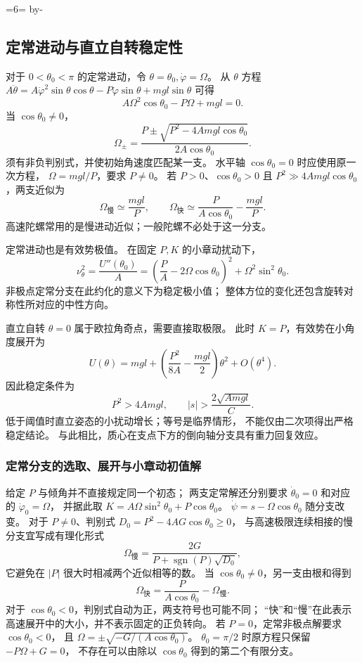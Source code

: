 \documentclass[UTF8,zihao=-4,fontset=fandol,a4paper]{ctexart}
\makeatletter
\newcommand{\Needspace}[1]{\par\if@nobreak\else\penalty0\begingroup\dimen0=#1\relax\dimen2=\pagegoal\advance\dimen2 by-\pagetotal\ifdim\dimen0>\dimen2\newpage\fi\endgroup\fi}
\let\SavedSubsection\subsection
\renewcommand{\subsection}{\Needspace{6\baselineskip}\SavedSubsection}
\makeatother
\begin{document}
\subsection{定常进动与直立自转稳定性}\label{sub:c3-9.4}
对于 $0<\theta_0<\pi$ 的定常进动，令
$\theta=\theta_0,\dot\varphi=\Omega$。
从 $\theta$ 方程
$A\ddot\theta=A\dot\varphi^2\sin\theta\cos\theta
-P\dot\varphi\sin\theta+mgl\sin\theta$
可得
\begin{equation}\label{eq:regularprecession}
A\Omega^2\cos\theta_0-P\Omega+mgl=0.
\end{equation}
当 $\cos\theta_0\ne0$，
\[
\Omega_\pm=\frac{P\pm\sqrt{P^2-4Amgl\cos\theta_0}}
{2A\cos\theta_0}.
\]
须有非负判别式，并使初始角速度匹配某一支。
水平轴 $\cos\theta_0=0$ 时应使用原一次方程，
$\Omega=mgl/P$，要求 $P\ne0$。
若 $P>0$、$\cos\theta_0>0$ 且
$P^2\gg4Amgl\cos\theta_0$，两支近似为
\[
\Omega_{\text{慢}}\simeq\frac{mgl}{P},\qquad
\Omega_{\text{快}}\simeq\frac{P}{A\cos\theta_0}-\frac{mgl}{P}.
\]
高速陀螺常用的是慢进动近似；一般陀螺不必处于这一分支。

定常进动也是有效势极值。
在固定 $P,K$ 的小章动扰动下，
\[
\nu_\theta^2=\frac{U''(\theta_0)}A
=\left(\frac PA-2\Omega\cos\theta_0\right)^2
+\Omega^2\sin^2\theta_0.
\]
非极点定常分支在此约化的意义下为稳定极小值；
整体方位的变化还包含旋转对称性所对应的中性方向。

直立自转 $\theta=0$ 属于欧拉角奇点，需要直接取极限。
此时 $K=P$，有效势在小角度展开为
\[
U(\theta)=mgl+
\left(\frac{P^2}{8A}-\frac{mgl}{2}\right)\theta^2+O(\theta^4).
\]
因此稳定条件为
\[
P^2>4Amgl,\qquad
|s|>\frac{2\sqrt{Amgl}}{C}.
\]
低于阈值时直立姿态的小扰动增长；等号是临界情形，
不能仅由二次项得出严格稳定结论。
与此相比，质心在支点下方的倒向轴分支具有重力回复效应。


\subsubsection*{定常分支的选取、展开与小章动初值解}
给定 $P$ 与倾角并不直接规定同一个初态；
两支定常解还分别要求 $\dot\theta_0=0$ 和对应的 $\dot\varphi_0=\Omega$，
并据此取 $K=A\Omega\sin^2\theta_0+P\cos\theta_0$。
$\dot\psi=s-\Omega\cos\theta_0$ 随分支改变。
对于 $P\ne0$、判别式 $D_0=P^2-4AG\cos\theta_0\ge0$，
与高速极限连续相接的慢分支宜写成有理化形式
\[
\Omega_{\text{慢}}=
\frac{2G}{P+\operatorname{sgn}(P)\sqrt{D_0}},
\]
它避免在 $|P|$ 很大时相减两个近似相等的数。
当 $\cos\theta_0\ne0$，另一支由根和得到
\[
\Omega_{\text{快}}=\frac{P}{A\cos\theta_0}-\Omega_{\text{慢}}.
\]
对于 $\cos\theta_0<0$，判别式自动为正，两支符号也可能不同；
“快”和“慢”在此表示高速展开中的大小，并不表示固定的正负转向。
若 $P=0$，定常非极点解要求 $\cos\theta_0<0$，
且 $\Omega=\pm\sqrt{-G/(A\cos\theta_0)}$。
$\theta_0=\pi/2$ 时原方程只保留 $-P\Omega+G=0$，
不存在可以由除以 $\cos\theta_0$ 得到的第二个有限分支。
\end{document}
